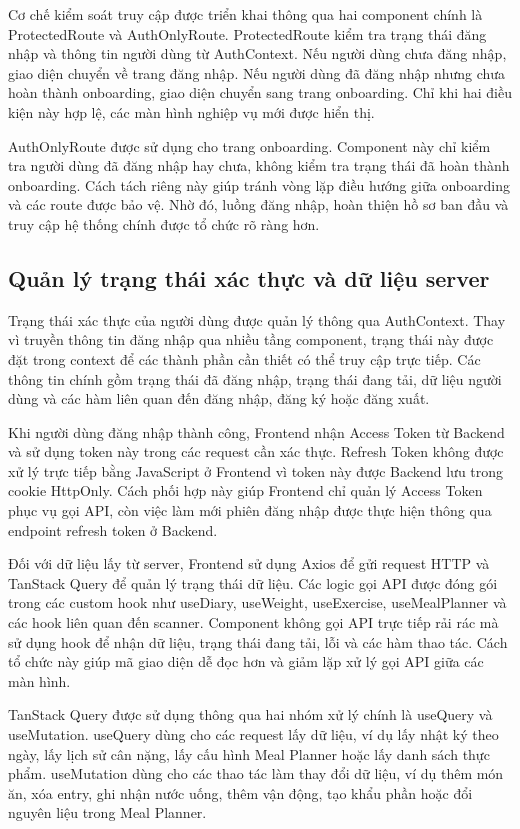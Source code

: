 \documentclass[12pt, a4paper]{report}
\begin{document}
Cơ chế kiểm soát truy cập được triển khai thông qua hai component chính là ProtectedRoute và AuthOnlyRoute. ProtectedRoute kiểm tra trạng thái đăng nhập và thông tin người dùng từ AuthContext. Nếu người dùng chưa đăng nhập, giao diện chuyển về trang đăng nhập. Nếu người dùng đã đăng nhập nhưng chưa hoàn thành onboarding, giao diện chuyển sang trang onboarding. Chỉ khi hai điều kiện này hợp lệ, các màn hình nghiệp vụ mới được hiển thị.

AuthOnlyRoute được sử dụng cho trang onboarding. Component này chỉ kiểm tra người dùng đã đăng nhập hay chưa, không kiểm tra trạng thái đã hoàn thành onboarding. Cách tách riêng này giúp tránh vòng lặp điều hướng giữa onboarding và các route được bảo vệ. Nhờ đó, luồng đăng nhập, hoàn thiện hồ sơ ban đầu và truy cập hệ thống chính được tổ chức rõ ràng hơn.

\subsection{Quản lý trạng thái xác thực và dữ liệu server}Trạng thái xác thực của người dùng được quản lý thông qua AuthContext. Thay vì truyền thông tin đăng nhập qua nhiều tầng component, trạng thái này được đặt trong context để các thành phần cần thiết có thể truy cập trực tiếp. Các thông tin chính gồm trạng thái đã đăng nhập, trạng thái đang tải, dữ liệu người dùng và các hàm liên quan đến đăng nhập, đăng ký hoặc đăng xuất.

Khi người dùng đăng nhập thành công, Frontend nhận Access Token từ Backend và sử dụng token này trong các request cần xác thực. Refresh Token không được xử lý trực tiếp bằng JavaScript ở Frontend vì token này được Backend lưu trong cookie HttpOnly. Cách phối hợp này giúp Frontend chỉ quản lý Access Token phục vụ gọi API, còn việc làm mới phiên đăng nhập được thực hiện thông qua endpoint refresh token ở Backend.

Đối với dữ liệu lấy từ server, Frontend sử dụng Axios để gửi request HTTP và TanStack Query để quản lý trạng thái dữ liệu. Các logic gọi API được đóng gói trong các custom hook như useDiary, useWeight, useExercise, useMealPlanner và các hook liên quan đến scanner. Component không gọi API trực tiếp rải rác mà sử dụng hook để nhận dữ liệu, trạng thái đang tải, lỗi và các hàm thao tác. Cách tổ chức này giúp mã giao diện dễ đọc hơn và giảm lặp xử lý gọi API giữa các màn hình.

TanStack Query được sử dụng thông qua hai nhóm xử lý chính là useQuery và useMutation. useQuery dùng cho các request lấy dữ liệu, ví dụ lấy nhật ký theo ngày, lấy lịch sử cân nặng, lấy cấu hình Meal Planner hoặc lấy danh sách thực phẩm. useMutation dùng cho các thao tác làm thay đổi dữ liệu, ví dụ thêm món ăn, xóa entry, ghi nhận nước uống, thêm vận động, tạo khẩu phần hoặc đổi nguyên liệu trong Meal Planner.
\end{document}
